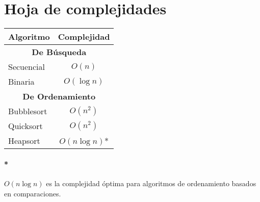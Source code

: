 \appendix
\section{Hoja de complejidades}
\begin{center}
\begin{tabular}{|l|c|}
	\hline
	\textbf{Algoritmo} & \textbf{Complejidad} \\
	\hline
	\multicolumn{2}{|c|}{\cellcolor{blue!25}\textbf{De Búsqueda}}\\
	\hline
	Secuencial & \(O(n)\) \\
	\hline
	Binaria & \(O(\log{n})\) \\
	\hline
	\multicolumn{2}{|c|}{\cellcolor{blue!25}\textbf{De Ordenamiento}}\\
	\hline
	Bubblesort & \(O(n^2)\) \\
	\hline
	Quicksort & \(O(n^2)\) \\
	\hline
	Heapsort & \(O(n\log{n})\)* \\
	\hline
\end{tabular}
\end{center}

\paragraph{*} \(O(n\log{n})\) es la complejidad óptima para algoritmos de ordenamiento basados en comparaciones. 

